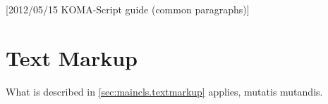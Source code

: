 %
%
%
%
%
%
%
%
% 
%
%
%
%

[2012/05/15 KOMA-Script guide (common paragraphs)]


\makeatletter
{}%
%
%
%
\makeatother


\section{Text Markup}
\label{sec:\csname label@base\endcsname.textmarkup}%
\ifshortversion\IgnoreThisfalse{}\fi%
\ifIgnoreThis %
What is described in
\autoref{sec:maincls.textmarkup} applies, mutatis mutandis.
\else %
%
%

